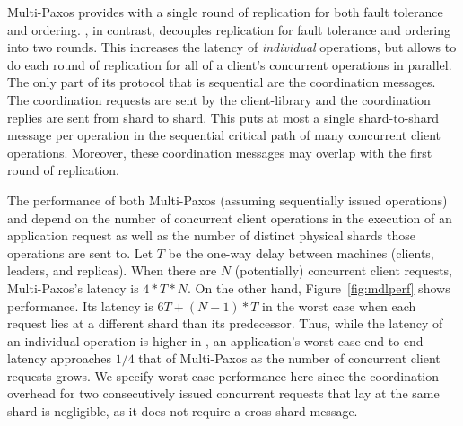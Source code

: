 Multi-Paxos provides \sdl{} with a single round of replication for both fault
tolerance and ordering.  \sys{}, in contrast, decouples replication for fault
tolerance and ordering into two rounds.  This increases the latency of
\textit{individual} operations, but allows \sys{} to do each round of
replication for all of a client's concurrent operations in parallel.  The only
part of its protocol that is sequential are the coordination messages.  The
coordination requests are sent by the client-library and the coordination
replies are sent from shard to shard.  This puts at most a single shard-to-shard
message per operation in the sequential critical path of many concurrent client
operations. Moreover, these coordination messages may overlap with the first
round of replication.

The performance of both Multi-Paxos (assuming sequentially issued operations) and \sys{} depend on the number of concurrent client operations in the execution of an
application request as well as the number of distinct physical shards those
operations are sent to. Let $T$ be the one-way delay between machines (clients,
leaders, and replicas).  When there are $N$ (potentially) concurrent client
requests, Multi-Paxos's latency is $4*T*N$. On the other hand,
Figure~\ref{fig:mdlperf} shows \sys{} performance. Its latency
is $6T + (N-1)*T$ in the worst case when each request lies at a different shard
than its predecessor.  Thus, while the latency of an individual operation is
higher in \sys{}, an application's worst-case end-to-end latency approaches
$1/4$ that of Multi-Paxos as the number of concurrent client requests grows. We
specify worst case performance here since the coordination overhead for two
consecutively issued concurrent requests that lay at the same shard is
negligible, as it does not require a cross-shard message. 




